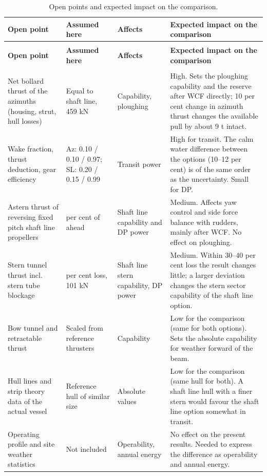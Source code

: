 \documentclass[a4paper,11pt]{article}
\begin{document}
\begin{longtable}{>{\raggedright\arraybackslash}p{3.6cm}>{\raggedright\arraybackslash}p{3.2cm}>{\raggedright\arraybackslash}p{2.6cm}>{\raggedright\arraybackslash}p{5.6cm}}
\caption{\label{tab:org6589897}Open points and expected impact on the comparison.}
\\[0pt]
\toprule
\textbf{Open point} & \textbf{Assumed here} & \textbf{Affects} & \textbf{Expected impact on the comparison}\\[0pt]
\midrule
\endfirsthead
\multicolumn{4}{l}{Continued from previous page} \\[0pt]
\toprule

\textbf{Open point} & \textbf{Assumed here} & \textbf{Affects} & \textbf{Expected impact on the comparison} \\[0pt]

\midrule
\endhead
\midrule\multicolumn{4}{r}{Continued on next page} \\
\endfoot
\endlastfoot
Net bollard thrust of the azimuths (housing, strut, hull losses) & Equal to shaft line, 459 kN & Capability, ploughing & High.  Sets the ploughing capability and the reserve after WCF directly; 10 per cent change in azimuth thrust changes the available pull by about 9 t intact.\\[0pt]
Wake fraction, thrust deduction, gear efficiency & Az: 0.10 / 0.10 / 0.97; SL: 0.20 / 0.15 / 0.99 & Transit power & High for transit.  The calm water difference between the options (10--12 per cent) is of the same order as the uncertainty.  Small for DP.\\[0pt]
Astern thrust of reversing fixed pitch shaft line propellers & 60 per cent of ahead & Shaft line capability and DP power & Medium.  Affects yaw control and side force balance with rudders, mainly after WCF.  No effect on ploughing.\\[0pt]
Stern tunnel thrust incl. stern tube blockage & 35 per cent loss, 101 kN & Shaft line stern capability, DP power & Medium.  Within 30--40 per cent loss the result changes little; a larger deviation changes the stern sector capability of the shaft line option.\\[0pt]
Bow tunnel and retractable thrust & Scaled from reference thrusters & Capability & Low for the comparison (same for both options).  Sets the absolute capability for weather forward of the beam.\\[0pt]
Hull lines and strip theory data of the actual vessel & Reference hull of similar size & Absolute values & Low for the comparison (same hull for both).  A shaft line hull with a finer stern would favour the shaft line option somewhat in transit.\\[0pt]
Operating profile and site weather statistics & Not included & Operability, annual energy & No effect on the present results.  Needed to express the difference as operability and annual energy.\\[0pt]
\bottomrule
\end{longtable}
\end{document}
